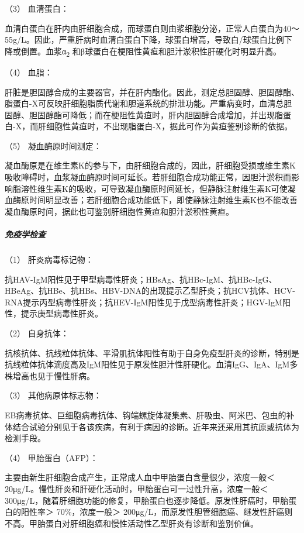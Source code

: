 \hypertarget{text00039.htmlux5cux23CHP1-16-3-4-3-3}{}
（3） 血清蛋白：

血清白蛋白在肝内由肝细胞合成，而球蛋白则由浆细胞分泌，正常人白蛋白为40～55g/L。因此，严重肝病时血清白蛋白下降，球蛋白增高，导致白/球蛋白比例下降或倒置。血浆α\textsubscript{2}
和β球蛋白在梗阻性黄疸和胆汁淤积性肝硬化时明显升高。

\hypertarget{text00039.htmlux5cux23CHP1-16-3-4-3-4}{}
（4） 血脂：

肝脏是胆固醇合成的主要器官，并在肝内酯化。因此，测定总胆固醇、胆固醇酯、脂蛋白-X可反映肝细胞脂质代谢和胆道系统的排泄功能。严重病变时，血清总胆固醇、胆固醇酯可降低；而在梗阻性黄疸时，肝内胆固醇合成增加，并出现脂蛋白-X，而肝细胞性黄疸时，不出现脂蛋白-X，据此可作为黄疸鉴别诊断的依据。

\hypertarget{text00039.htmlux5cux23CHP1-16-3-4-3-5}{}
（5） 凝血酶原时间测定：

凝血酶原是在维生素K的参与下，由肝细胞合成的，因此，肝细胞受损或维生素K吸收障碍时，血浆凝血酶原时间可延长。若肝细胞合成功能正常，因胆汁淤积而影响脂溶性维生素K的吸收，可导致凝血酶原时间延长，但静脉注射维生素K可使凝血酶原时间明显改善；若肝细胞合成功能低下，即使静脉注射维生素K也不能改善凝血酶原时间，据此也可鉴别肝细胞性黄疸和胆汁淤积性黄疸。

\subparagraph{免疫学检查}

\hypertarget{text00039.htmlux5cux23CHP1-16-3-4-4-1}{}
（1） 肝炎病毒标记物：

抗HAV-IgM阳性见于甲型病毒性肝炎；HBsAg、抗HBc-IgM、抗HBc-IgG、HBeAg、抗HBe、抗HBs、HBV-DNA的出现提示乙型肝炎；抗HCV抗体、HCV-RNA提示丙型病毒性肝炎；抗HEV-IgM阳性见于戊型病毒性肝炎；HGV-IgM阳性，提示庚型病毒性肝炎。

\hypertarget{text00039.htmlux5cux23CHP1-16-3-4-4-2}{}
（2） 自身抗体：

抗核抗体、抗线粒体抗体、平滑肌抗体阳性有助于自身免疫型肝炎的诊断，特别是抗线粒体抗体滴度高及IgM阳性见于原发性胆汁性肝硬化。血清IgG、IgA、IgM多株增高也见于慢性肝病。

\hypertarget{text00039.htmlux5cux23CHP1-16-3-4-4-3}{}
（3） 其他病原体标志物：

EB病毒抗体、巨细胞病毒抗体、钩端螺旋体凝集素、肝吸虫、阿米巴、包虫的补体结合试验分别见于各该疾病，有利于病因的诊断。近年来还采用其抗原或抗体为检测手段。

\hypertarget{text00039.htmlux5cux23CHP1-16-3-4-4-4}{}
（4） 甲胎蛋白（AFP）：

主要由新生肝细胞合成产生，正常成人血中甲胎蛋白含量很少，浓度一般＜
20μg/L。慢性肝炎和肝硬化活动时，甲胎蛋白可一过性升高，浓度一般＜
300μg/L，随着肝细胞功能的修复，甲胎蛋白也逐步降低。原发性肝癌时，甲胎蛋白的阳性率＞
70\%，浓度一般＞
200μg/L，而原发性胆管细胞癌、继发性肝癌则不高。甲胎蛋白对肝细胞癌和慢性活动性乙型肝炎有诊断和鉴别价值。

